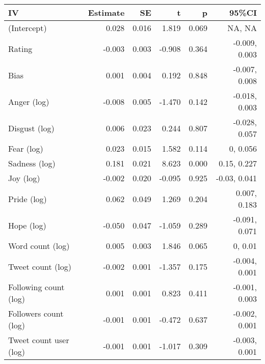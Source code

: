 
\begin{tabular}{lrrrrr}
\toprule
IV & Estimate & SE & t & p & 95\%CI\\
\midrule
(Intercept) & 0.028 & 0.016 & 1.819 & 0.069 & NA, NA\\
Rating & -0.003 & 0.003 & -0.908 & 0.364 & -0.009, 0.003\\
Bias & 0.001 & 0.004 & 0.192 & 0.848 & -0.007, 0.008\\
Anger (log) & -0.008 & 0.005 & -1.470 & 0.142 & -0.018, 0.003\\
Disgust (log) & 0.006 & 0.023 & 0.244 & 0.807 & -0.028, 0.057\\
Fear (log) & 0.023 & 0.015 & 1.582 & 0.114 & 0, 0.056\\
Sadness (log) & 0.181 & 0.021 & 8.623 & 0.000 & 0.15, 0.227\\
Joy (log) & -0.002 & 0.020 & -0.095 & 0.925 & -0.03, 0.041\\
Pride (log) & 0.062 & 0.049 & 1.269 & 0.204 & 0.007, 0.183\\
Hope (log) & -0.050 & 0.047 & -1.059 & 0.289 & -0.091, 0.071\\
Word count (log) & 0.005 & 0.003 & 1.846 & 0.065 & 0, 0.01\\
Tweet count (log) & -0.002 & 0.001 & -1.357 & 0.175 & -0.004, 0.001\\
Following count (log) & 0.001 & 0.001 & 0.823 & 0.411 & -0.001, 0.003\\
Followers count (log) & -0.001 & 0.001 & -0.472 & 0.637 & -0.002, 0.001\\
Tweet count user (log) & -0.001 & 0.001 & -1.017 & 0.309 & -0.003, 0.001\\
\bottomrule
\end{tabular}
